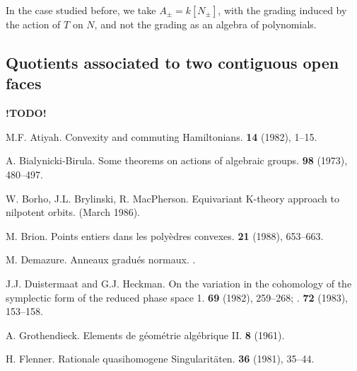 \documentclass{article}
\newcommand{\todo}{\textbf{ !TODO! }}
\begin{document}
In the case studied before, we take $A_\pm=k[N_\pm]$, with the grading induced by the action of $T$ on $N$, and not the grading as an algebra of polynomials.


\subsection{Quotients associated to two contiguous open faces}
\label{2.3}







\todo





\nocite{*}

\begin{thebibliography}{25}

  {M.F. Atiyah.}
  \newblock Convexity and commuting Hamiltonians.
   \textbf{14} (1982), 1--15.

  {A. Bialynicki-Birula.}
  \newblock Some theorems on actions of algebraic groups.
   \textbf{98} (1973), 480--497.

  {W. Borho, J.L. Brylinski, R. MacPherson.}
  \newblock Equivariant K-theory approach to nilpotent orbits.
   (March 1986).

  {M. Brion.}
  \newblock Points entiers dans les poly\`{e}dres convexes.
   \textbf{21} (1988), 653--663.

  {M. Demazure.}
  \newblock Anneaux gradu\'{e}s normaux.
  .

  {J.J. Duistermaat and G.J. Heckman.}
  \newblock On the variation in the cohomology of the symplectic form of the reduced phase space 1.
   \textbf{69} (1982), 259--268;
  .
   \textbf{72} (1983), 153--158.

  {A. Grothendieck.}
  \newblock Elements de g\'{e}om\'{e}trie alg\'{e}brique II.
   \textbf{8} (1961).

  {H. Flenner.}
  \newblock Rationale quasihomogene Singularit\"{a}ten.
   \textbf{36} (1981), 35--44.


\end{thebibliography}
\end{document}
